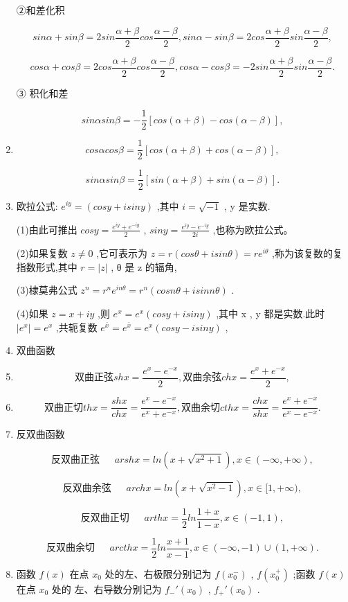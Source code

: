 \documentclass[UTF8]{ctexart}
\theoremstyle{remark}
\begin{document}
\begin{enumerate}
	②和差化积 
	
	\[sin \alpha+sin \beta=2 sin \frac{\alpha+\beta}{2} cos \frac{\alpha-\beta}{2}, sin \alpha-sin \beta=2 cos \frac{\alpha+\beta}{2} sin \frac{\alpha-\beta}{2},\]
	
	\[cos \alpha+cos \beta=2 cos \frac{\alpha+\beta}{2} cos \frac{\alpha-\beta}{2}, cos \alpha-cos \beta=-2 sin \frac{\alpha+\beta}{2} sin \frac{\alpha-\beta}{2} .\]
	
	③ 积化和差 
	
	\[sin \alpha sin \beta=-\frac{1}{2}[cos (\alpha+\beta)-cos (\alpha-\beta)],\]
	
	\item 
	\[cos \alpha cos \beta=\frac{1}{2}[cos (\alpha+\beta)+cos (\alpha-\beta)],\]
	
	\[sin \alpha sin \beta=\frac{1}{2}[sin (\alpha+\beta)+sin (\alpha-\beta)] .\]
	
	\item 欧拉公式: \(e^{i y}=(cos y+isin y)\) ,其中 \(i=\sqrt{-1}\) , y 是实数.
	
	(1)由此可推出 \(cos y=\frac{e^{i y}+e^{-i y}}{2}\) , \(sin y=\frac{e^{i y}-e^{-i y}}{2 i}\) ,也称为欧拉公式。
	
	(2)如果复数 \(z ≠0\) ,它可表示为 \(z=r(cos \theta+i sin \theta)=r e^{i \theta}\) ,称为该复数的复指数形式,其中 \(r=|z|\) , θ 是 z 的辐角,
	
	(3)棣莫弗公式 \(z^{n}=r^{n} e^{i n \theta}=r^{n}(cos n \theta+i sin n \theta)\) .
	
	(4)如果 \(z=x+i y\) ,则 \(e^{x}=e^{x}(cos y+isin y)\) ,其中 x , y 都是实数.此时 \(|e^{x}|=e^{x}\) ,共轭复数 \(e^{\bar{x}}=e^{\bar{x}}=e^{x}(cos y-i sin y)\) ,
	
	\item 双曲函数
	\item 
	\[\text{双曲正弦} sh x=\frac{e^{x}-e^{-x}}{2}, \text{双曲余弦} ch x=\frac{e^{x}+e^{-x}}{2},\]
	
	\item 
	\[\text{双曲正切} th x=\frac{sh x}{ch x}=\frac{e^{x}-e^{-x}}{e^{x}+e^{-x}}, \text{双曲余切} cth x=\frac{ch x}{sh x}=\frac{e^{x}+e^{-x}}{e^{x}-e^{-x}}.\]
	
	\item 反双曲函数
	
	\[\text{反双曲正弦}~~~~~~~arsh x=ln \left(x+\sqrt{x^{2}+1}\right), x \in(-\infty,+\infty),\]
	
	\[\text{反双曲余弦}~~~~~~~arch x=ln \left(x+\sqrt{x^{2}-1}\right), x \in[1,+\infty),\]
	
	\[\text{反双曲正切}~~~~~~~arth x=\frac{1}{2} ln \frac{1+x}{1-x}, x \in(-1,1),\]
	
	\[\text{反双曲余切}~~~~~~~arcth x=\frac{1}{2} ln \frac{x+1}{x-1}, x \in(-\infty,-1) \cup(1,+\infty).\]
	
	\item 函数 \(f(x)\) 在点 \(x_{0}\) 处的左、右极限分别记为 \(f(x_{0}^{-})\) , \(f(x_{0}^{+})\) ;函数 \(f(x)\) 在点 \(x_{0}\) 处的 左、右导数分别记为 \(f_{-}'(x_{0})\) , \(f_{+}'(x_{0})\) .
\end{enumerate}
\end{document}

